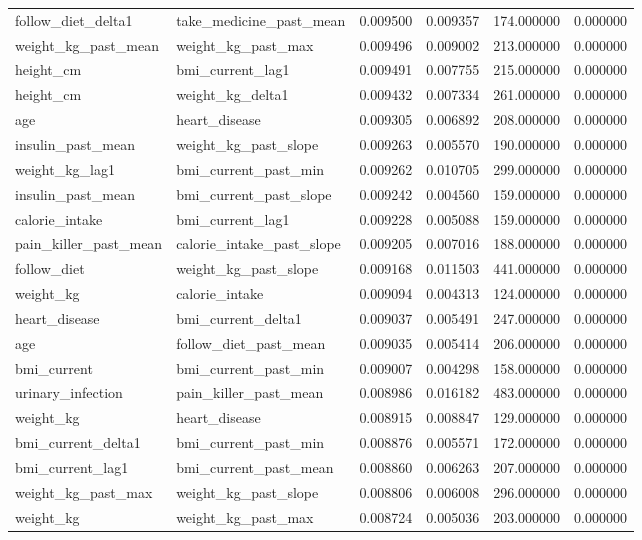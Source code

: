 \begin{longtable}{llrrrr}
follow\_diet\_delta1 & take\_medicine\_past\_mean & 0.009500 & 0.009357 & 174.000000 & 0.000000 \\
weight\_kg\_past\_mean & weight\_kg\_past\_max & 0.009496 & 0.009002 & 213.000000 & 0.000000 \\
height\_cm & bmi\_current\_lag1 & 0.009491 & 0.007755 & 215.000000 & 0.000000 \\
height\_cm & weight\_kg\_delta1 & 0.009432 & 0.007334 & 261.000000 & 0.000000 \\
age & heart\_disease & 0.009305 & 0.006892 & 208.000000 & 0.000000 \\
insulin\_past\_mean & weight\_kg\_past\_slope & 0.009263 & 0.005570 & 190.000000 & 0.000000 \\
weight\_kg\_lag1 & bmi\_current\_past\_min & 0.009262 & 0.010705 & 299.000000 & 0.000000 \\
insulin\_past\_mean & bmi\_current\_past\_slope & 0.009242 & 0.004560 & 159.000000 & 0.000000 \\
calorie\_intake & bmi\_current\_lag1 & 0.009228 & 0.005088 & 159.000000 & 0.000000 \\
pain\_killer\_past\_mean & calorie\_intake\_past\_slope & 0.009205 & 0.007016 & 188.000000 & 0.000000 \\
follow\_diet & weight\_kg\_past\_slope & 0.009168 & 0.011503 & 441.000000 & 0.000000 \\
weight\_kg & calorie\_intake & 0.009094 & 0.004313 & 124.000000 & 0.000000 \\
heart\_disease & bmi\_current\_delta1 & 0.009037 & 0.005491 & 247.000000 & 0.000000 \\
age & follow\_diet\_past\_mean & 0.009035 & 0.005414 & 206.000000 & 0.000000 \\
bmi\_current & bmi\_current\_past\_min & 0.009007 & 0.004298 & 158.000000 & 0.000000 \\
urinary\_infection & pain\_killer\_past\_mean & 0.008986 & 0.016182 & 483.000000 & 0.000000 \\
weight\_kg & heart\_disease & 0.008915 & 0.008847 & 129.000000 & 0.000000 \\
bmi\_current\_delta1 & bmi\_current\_past\_min & 0.008876 & 0.005571 & 172.000000 & 0.000000 \\
bmi\_current\_lag1 & bmi\_current\_past\_mean & 0.008860 & 0.006263 & 207.000000 & 0.000000 \\
weight\_kg\_past\_max & weight\_kg\_past\_slope & 0.008806 & 0.006008 & 296.000000 & 0.000000 \\
weight\_kg & weight\_kg\_past\_max & 0.008724 & 0.005036 & 203.000000 & 0.000000 \\

\end{longtable}
